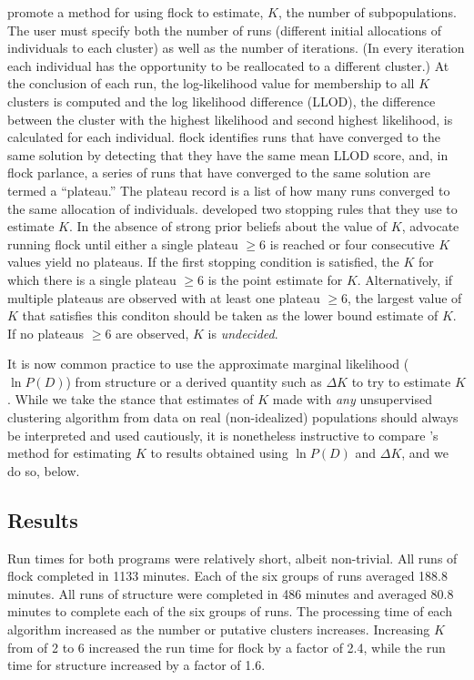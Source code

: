 \citet{Duc&Tur2012} promote a method for using {\sc flock} to estimate, $K$, the number of
subpopulations. The user must specify both the number of runs (different initial allocations of individuals 
to each cluster) as well as the number of iterations. (In every iteration each individual has the opportunity to be reallocated 
to a different cluster.) At the conclusion of each run, the log-likelihood value for membership to all $K$ clusters is computed
and the log likelihood difference (LLOD), the difference between the cluster with the highest likelihood 
and second highest likelihood, is calculated for each individual. {\sc flock} identifies runs that 
have converged to the same solution by detecting that they have the same mean LLOD score, and, in 
{\sc flock} parlance, a series of runs that have converged to the same solution are termed a ``plateau.'' 
The plateau record is a list of how many runs converged to the same allocation
of individuals. 
\citet{Duc&Tur2012} developed two stopping rules that they use to estimate $K$. In the absence of 
strong prior beliefs about the value of $K$, \citet{Duc&Tur2012} advocate running  {\sc flock} until either a single plateau 
$\geq 6$  is reached or four consecutive $K$ values yield no plateaus. If the first stopping condition is satisfied,
the $K$ for which there is a single plateau $\geq 6$ is the point estimate for $K$. Alternatively, 
if multiple plateaus are observed with at least one plateau $\geq 6$, the largest value of $K$ that satisfies 
this conditon should be taken as the lower bound estimate of $K$. If no plateaus $\geq 6$ are observed, $K$
is \textit{undecided}.  


It is now common practice to use the approximate marginal likelihood ($\ln P(D)$) from {\sc structure}
or a derived quantity such as $\Delta K$ \citep{Evannoetal2005} to try to estimate $K$.
While we take the stance that estimates of $K$ made with {\em any} unsupervised clustering algorithm
from data on real (non-idealized) populations should always be interpreted and used
cautiously, it is nonetheless instructive to compare \citet{Duc&Tur2012}'s method for
estimating $K$ to results obtained using $\ln P(D)$ and $\Delta K$, and we do so, below. 


\subsection*{Results} 
Run times for both programs were relatively short, albeit non-trivial. All runs of {\sc flock} 
completed in 1133 minutes. Each of the six groups of runs averaged 188.8 minutes.
All runs of {\sc structure} were completed in 
486 minutes and averaged 80.8 minutes to complete each of the six groups of runs.
The processing time of each algorithm increased as the number or 
putative clusters increases. Increasing
$K$ from of 2 to 6 increased the run time for {\sc flock} by a factor of 2.4, while the run time 
for {\sc structure} increased by a factor of 1.6.


